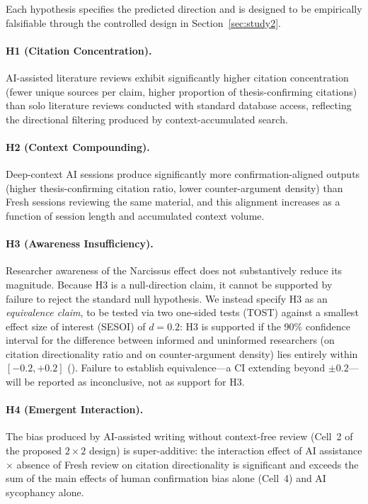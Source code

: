 \documentclass[12pt]{article}
\begin{document}
Each hypothesis specifies the predicted direction and is designed to be empirically falsifiable through the controlled design in Section~\ref{sec:study2}.

\paragraph{H1 (Citation Concentration).} AI-assisted literature reviews exhibit significantly higher citation concentration (fewer unique sources per claim, higher proportion of thesis-confirming citations) than solo literature reviews conducted with standard database access, reflecting the directional filtering produced by context-accumulated search.

\paragraph{H2 (Context Compounding).} Deep-context AI sessions produce significantly more confirmation-aligned outputs (higher thesis-confirming citation ratio, lower counter-argument density) than Fresh sessions reviewing the same material, and this alignment increases as a function of session length and accumulated context volume.

\paragraph{H3 (Awareness Insufficiency).} Researcher awareness of the Narcissus effect does not substantively reduce its magnitude. Because H3 is a null-direction claim, it cannot be supported by failure to reject the standard null hypothesis. We instead specify H3 as an \emph{equivalence claim}, to be tested via two one-sided tests (TOST) against a smallest effect size of interest (SESOI) of $d = 0.2$: H3 is supported if the 90\% confidence interval for the difference between informed and uninformed researchers (on citation directionality ratio and on counter-argument density) lies entirely within $[-0.2, +0.2]$ (\citealp{lakens2017}). Failure to establish equivalence---a CI extending beyond $\pm 0.2$---will be reported as inconclusive, not as support for H3.

\paragraph{H4 (Emergent Interaction).} The bias produced by AI-assisted writing without context-free review (Cell~2 of the proposed $2 \times 2$ design) is super-additive: the interaction effect of AI assistance $\times$ absence of Fresh review on citation directionality is significant and exceeds the sum of the main effects of human confirmation bias alone (Cell~4) and AI sycophancy alone.
\end{document}
